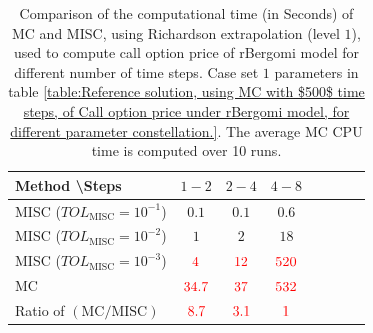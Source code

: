 \begin{table}[!h]
	\centering
	\begin{tabular}{l*{6}{c}r}
		Method \textbackslash  Steps            & $1-2$ & $2-4$ & $4-8$   \\
		\hline
		MISC ($TOL_{\text{MISC}}=10^{-1}$)  & $0.1$ & $0.1$ & $0.6$ \\
		MISC ($TOL_{\text{MISC}}=10^{-2}$)  & $1$ & $2$ & $18$   \\
		MISC ($TOL_{\text{MISC}}=10^{-3}$)  & ${\color{red}4}$ & ${\color{red}12}$ & ${\color{red}520}$   \\	
		\hline
		MC   & ${\color{red} 34.7}$  & ${\color{red}37}$  & $ {\color{red}532}$    \\
		
		\hline
		Ratio of $\left(\text{MC}/ \text{MISC} \right)$  &${\color{red}8.7}$ & ${\color{red}   3.1
		}$  & ${\color{red}1}$ \\
		\hline
	\end{tabular}
	\caption{Comparison of the computational time (in Seconds) of  MC and MISC, using Richardson extrapolation (level $1$), used to compute call option price of rBergomi model for different number of time steps. Case set $1$ parameters in table \ref{table:Reference solution, using MC with $500$ time steps, of Call option price under rBergomi model, for different parameter constellation.}. The
		average MC CPU time is computed over 10 runs.}
	\label{Comparsion of the computational time of  MC and MISC, using Richardson extrapolation (level $1$), used to compute Call option price of rBergomi model for different number of time steps. Case set $1$ parameters}
\end{table}




\FloatBarrier

